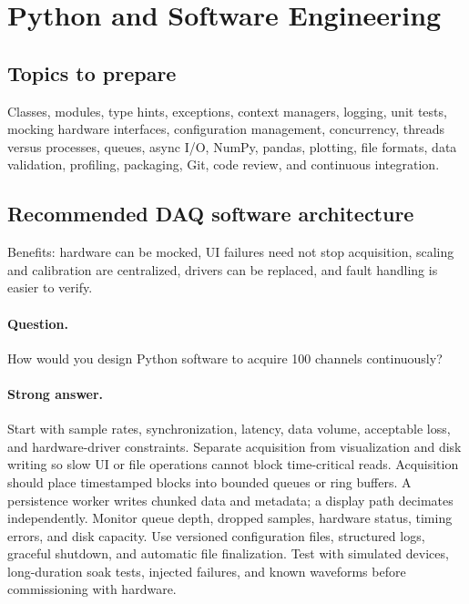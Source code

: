 \documentclass[11pt]{article}
\newcommand{\q}[1]{\paragraph{Question.} #1}
\newcommand{\ans}[1]{\paragraph{Strong answer.} #1}
\begin{document}
\section{Python and Software Engineering}

\subsection{Topics to prepare}
Classes, modules, type hints, exceptions, context managers, logging, unit tests,
mocking hardware interfaces, configuration management, concurrency, threads
versus processes, queues, async I/O, NumPy, pandas, plotting, file formats, data
validation, profiling, packaging, Git, code review, and continuous integration.

\subsection{Recommended DAQ software architecture}
\begin{center}
\end{center}

Benefits: hardware can be mocked, UI failures need not stop acquisition, scaling
and calibration are centralized, drivers can be replaced, and fault handling is
easier to verify.

\q{How would you design Python software to acquire 100 channels continuously?}
\ans{Start with sample rates, synchronization, latency, data volume, acceptable
loss, and hardware-driver constraints. Separate acquisition from visualization
and disk writing so slow UI or file operations cannot block time-critical reads.
Acquisition should place timestamped blocks into bounded queues or ring buffers.
A persistence worker writes chunked data and metadata; a display path decimates
independently. Monitor queue depth, dropped samples, hardware status, timing
errors, and disk capacity. Use versioned configuration files, structured logs,
graceful shutdown, and automatic file finalization. Test with simulated devices,
long-duration soak tests, injected failures, and known waveforms before
commissioning with hardware.}
\end{document}
